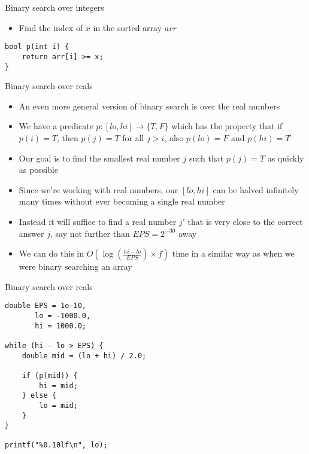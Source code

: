 \documentclass[12pt,t]{beamer}
\newcommand{\bi}{\begin{itemize}}
\newcommand{\ei}{\end{itemize}}
\begin{document}
\begin{frame}[fragile]{Binary search over integers}
    \bi
        \item Find the index of $x$ in the sorted array $arr$
    \ei
    \begin{verbatim}
bool p(int i) {
    return arr[i] >= x;
}
    \end{verbatim}

\end{frame}

\begin{frame}[fragile]{Binary search over reals}
    \bi
        \item An even more general version of binary search is over the real numbers
		\item We have a predicate $p : [lo,hi] \rightarrow \{T, F\}$ which has the property that if $p(i) = T$, then $p(j) = T$ for all $j > i$, also $p(lo)= F$ and $p(hi) = T$
        \item Our goal is to find the smallest real number $j$ such that $p(j) = T$ as quickly as possible

        \vspace{5pt}
        \item Since we're working with real numbers, our $[lo,hi]$ can be halved infinitely many times without ever becoming a single real number
        \item Instead it will suffice to find a real number $j'$ that is very close to the correct answer $j$, say not further than $EPS = 2^{-30}$ away

        \vspace{5pt}
    \item We can do this in $O(\log(\frac{hi - lo}{EPS}) \times f)$ time in a similar way as when we were binary searching an array
    \ei
\end{frame}

\begin{frame}[fragile]{Binary search over reals}
    \begin{verbatim}
double EPS = 1e-10,
       lo = -1000.0,
       hi = 1000.0;

while (hi - lo > EPS) {
    double mid = (lo + hi) / 2.0;

    if (p(mid)) {
        hi = mid;
    } else {
        lo = mid;
    }
}

printf("%0.10lf\n", lo);
    \end{verbatim}
\end{frame}
\end{document}
